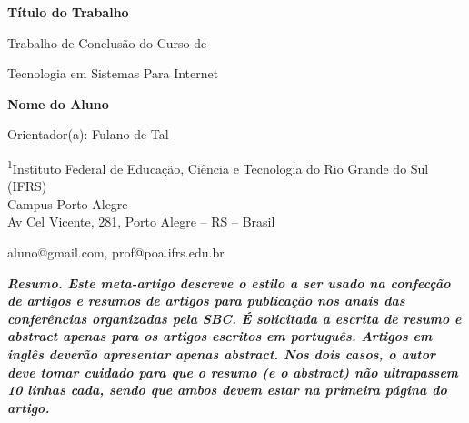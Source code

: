 \documentclass[12pt]{article}
\begin{document}
\begin{Center}
{\fontsize{16pt}{19.2pt}\selectfont \textbf{Título do Trabalho}\par}
\end{Center}\par

\begin{Center}
{\fontsize{11pt}{13.2pt}\selectfont Trabalho de Conclusão do Curso de\par}
\end{Center}\par

\begin{Center}
{\fontsize{11pt}{13.2pt}\selectfont Tecnologia em Sistemas Para Internet\par}
\end{Center}\par

\begin{Center}
\textbf{Nome do Aluno}
\end{Center}\par

\begin{Center}
{\fontsize{11pt}{13.2pt}\selectfont Orientador(a): Fulano de Tal\par}
\end{Center}\par

\begin{Center}
\textsuperscript{1}Instituto Federal de Educação, Ciência e Tecnologia do Rio Grande do Sul (IFRS)\\
Campus Porto Alegre\\
Av Cel Vicente, 281, Porto Alegre – RS – Brasil
\end{Center}\par

\begin{Center}
{\fontsize{10pt}{12.0pt}\selectfont aluno@gmail.com, prof@poa.ifrs.edu.br\par}
\end{Center}\par

\textit{\textbf{Resumo. Este meta-artigo descreve o estilo a ser usado na confecção de artigos e resumos de artigos para publicação nos anais das conferências organizadas pela SBC. É solicitada a escrita de resumo e abstract apenas para os artigos escritos em português. Artigos em inglês deverão apresentar apenas abstract. Nos dois casos, o autor deve tomar cuidado para que o resumo (e o abstract) não ultrapassem 10 linhas cada, sendo que ambos devem estar na primeira página do artigo.}}\par
\end{document}
